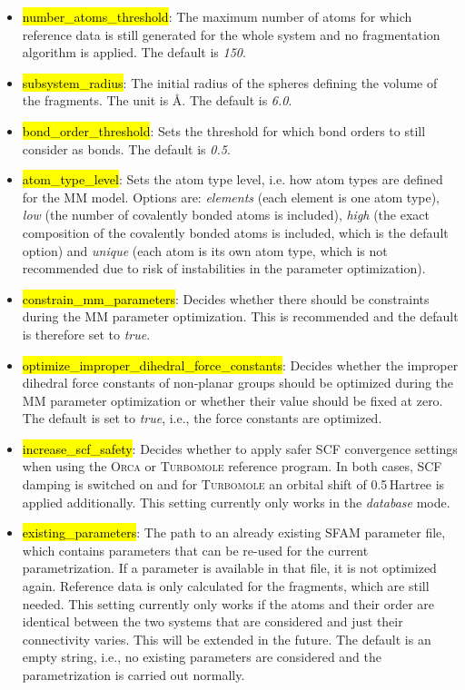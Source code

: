 \documentclass[]{tufte-book}
\begin{document}
{{\begin{itemize}
\item \hl{number\_atoms\_threshold}: The maximum number of atoms for which reference data is still generated for the whole system and no fragmentation algorithm is applied. The default is \textit{150}.
\item \hl{subsystem\_radius}: The initial radius of the spheres defining the volume of the fragments. The unit is \AA. The default is \textit{6.0}.
\item \hl{bond\_order\_threshold}: Sets the threshold for which bond orders to still consider as bonds. The default is \textit{0.5}.
\item \hl{atom\_type\_level}: Sets the atom type level, i.e. how atom types are defined for the MM model. Options are: \textit{elements} (each element is one atom type), \textit{low} (the number of covalently bonded atoms is included), \textit{high} (the exact composition of the covalently bonded atoms is included, which is the default option) and \textit{unique} (each atom is its own atom type, which is not recommended due to risk of instabilities in the parameter optimization).
\item \hl{constrain\_mm\_parameters}: Decides whether there should be constraints during the MM parameter optimization. This is recommended and the default is therefore set to \textit{true}.
\item \hl{optimize\_improper\_dihedral\_force\_constants}: Decides whether the improper dihedral force constants of non-planar groups should be optimized during the MM parameter optimization or whether their value should be fixed at zero. The default is set to \textit{true}, i.e., the force constants are optimized.
\item \hl{increase\_scf\_safety}: Decides whether to apply safer SCF convergence settings when using the \textsc{Orca} or \textsc{Turbomole} reference program. In both cases, SCF damping is switched on and for \textsc{Turbomole} an orbital shift of 0.5\,Hartree is applied additionally. This setting currently only works in the \textit{database} mode.
\item \hl{existing\_parameters}: The path to an already existing SFAM parameter file, which contains parameters that can be re-used for the current parametrization. If a parameter is available in that file, it is not optimized again. Reference data is only calculated for the fragments, which are still needed. This setting currently only works if the atoms and their order are identical between the two systems that are considered and just their connectivity varies. This will be extended in the future. The default is an empty string, i.e., no existing parameters are considered and the parametrization is carried out normally.

\end{itemize}}}
\end{document}
